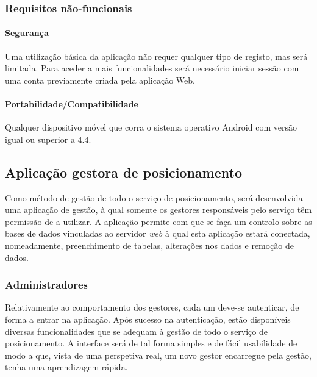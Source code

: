 \documentclass[12pt]{article} %
\begin{document}
\subsubsection{Requisitos não-funcionais}

\paragraph{Segurança}
Uma utilização básica da aplicação não requer qualquer tipo de registo, mas será limitada. Para aceder a mais funcionalidades será necessário iniciar sessão com uma conta previamente criada pela aplicação Web. \par

\paragraph{Portabilidade/Compatibilidade}
Qualquer dispositivo móvel que corra o sistema operativo Android com versão igual ou superior a 4.4.\par

\pagebreak


\subsection{Aplicação gestora de posicionamento}
Como método de gestão de todo o serviço de posicionamento, será desenvolvida uma aplicação de gestão, à qual somente os gestores responsáveis pelo serviço têm permissão de a utilizar. A aplicação permite com que se faça um controlo sobre as bases de dados vinculadas ao servidor \textit{web} à qual esta aplicação estará conectada, nomeadamente, preenchimento de tabelas, alterações nos dados e remoção de dados.\par

\subsubsection{Administradores}
Relativamente ao comportamento dos gestores, cada um deve-se autenticar, de forma a entrar na aplicação. Após sucesso na autenticação, estão disponíveis diversas funcionalidades que se adequam à gestão de todo o serviço de posicionamento. A interface será de tal forma simples e de fácil usabilidade de modo a que, vista de uma perspetiva real, um novo gestor encarregue pela gestão, tenha uma aprendizagem rápida.\par
\end{document}
